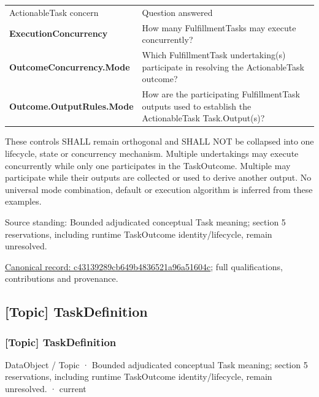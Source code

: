 \begin{longtable}{>{\raggedright\arraybackslash}p{}>{\raggedright\arraybackslash}p{}}
ActionableTask concern & Question answered \\
\textbf{ExecutionConcurrency} & How many FulfillmentTasks may execute concurrently? \\
\textbf{OutcomeConcurrency.Mode} & Which FulfillmentTask undertaking(s) participate in resolving the ActionableTask outcome? \\
\textbf{Outcome.OutputRules.Mode} & How are the participating FulfillmentTask outputs used to establish the ActionableTask Task.Output(s)? \\
\end{longtable}


These controls SHALL remain orthogonal and SHALL NOT be collapsed into one
lifecycle, state or concurrency mechanism. Multiple undertakings may execute
concurrently while only one participates in the TaskOutcome. Multiple may
participate while their outputs are collected or used to derive another
output. No universal mode combination, default or execution algorithm is
inferred from these examples.



Source standing: Bounded adjudicated conceptual Task meaning; section 5 reservations, including runtime TaskOutcome identity/lifecycle, remain unresolved.


{\footnotesize \href{../../../../continuum/application/data-object/topic/c43139289cb649b4836521a96a51604c.md}{Canonical record: c43139289cb649b4836521a96a51604c}; full qualifications, contributions and provenance.}\par
\subsection{[Topic] TaskDefinition}

\subsubsection{[Topic] TaskDefinition}

\label{element:1d6d4c3a2df440be94262855fa6564eb}
{\small DataObject / Topic · Bounded adjudicated conceptual Task meaning; section 5 reservations, including runtime TaskOutcome identity/lifecycle, remain unresolved. · current}\par

